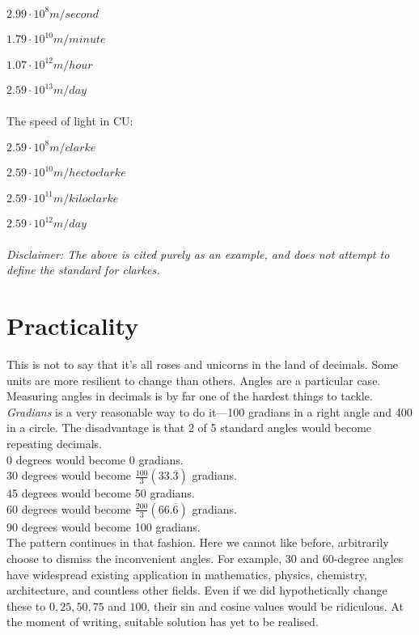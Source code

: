 \(2.99\cdot10^8 m/second\)

\(1.79\cdot10^{10}m/minute\)

\(1.07\cdot10^{12}m/hour\)

\(2.59\cdot10^{13}m/day\)
\\~\\
The speed of light in CU\@:

\(2.59\cdot10^8 m/clarke\)

\(2.59\cdot10^{10} m/hectoclarke\)

\(2.59\cdot10^{11} m/kiloclarke\)

\(2.59\cdot10^{12} m/day\)
\\~\\
\textit{Disclaimer: The above is cited purely as an example, and does not attempt to define the standard for clarkes.}

\section{Practicality}
This is not to say that it's all roses and unicorns in the land of decimals.
Some units are more resilient to change than others.
Angles are a particular case. Measuring angles in decimals is by far one of the hardest things to tackle.
\textit{Gradians} is a very reasonable way to do it—100 gradians in a right angle and 400 in a circle. The disadvantage is that 2 of 5 standard angles would become repeating decimals.\\
0 degrees would become 0 gradians.\\
30 degrees would become \(\frac{100}{3}(33.\overline{3})\) gradians.\\
45 degrees would become 50 gradians.\\
60 degrees would become \(\frac{200}{3}(66.\overline{6})\) gradians.\\
90 degrees would become 100 gradians.\\
The pattern continues in that fashion.
Here we cannot like before, arbitrarily choose to dismiss the inconvenient angles.
For example, 30 and 60-degree angles have widespread existing application in mathematics, physics, chemistry, architecture, and countless other fields.
Even if we did hypothetically change these to \(0,25,50,75\) and \(100\), their sin and cosine values would be ridiculous.
At the moment of writing, suitable solution has yet to be realised.
